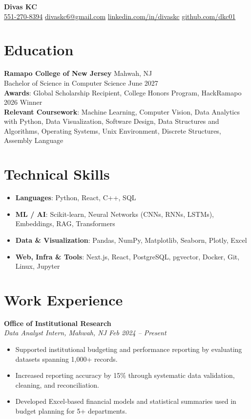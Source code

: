 \documentclass[4paper,25pt]{article}
\begin{document}
\begin{center}
    \textbf{\LARGE Divas KC} \\[5pt]
    \href{tel:+15512708394}{551-270-8394} \hfill
    \href{mailto:divaskc6@gmail.com}{divaskc6@gmail.com} \hfill
    \href{https://www.linkedin.com/in/divaskc/}{linkedin.com/in/divaskc} \hfill
    \href{https://github.com/dkc01}{github.com/dkc01}
\end{center}

\section{Education}
\textbf{Ramapo College of New Jersey} \hfill Mahwah, NJ\\
Bachelor of Science in Computer Science \hfill June 2027\\
\textbf{Awards}: Global Scholarship Recipient, College Honors Program, HackRamapo 2026 Winner\\
\textbf{Relevant Coursework}: Machine Learning, Computer Vision, Data Analytics with Python, Data Visualization, Software Design, Data Structures and Algorithms, Operating Systems, Unix Environment, Discrete Structures, Assembly Language

\section{Technical Skills}
\begin{itemize}\setlength\itemsep{0em}
    \item \textbf{Languages}: Python, React, C++, SQL
    \item \textbf{ML / AI}: Scikit-learn, Neural Networks (CNNs, RNNs, LSTMs), Embeddings, RAG, Transformers
    \item \textbf{Data \& Visualization}: Pandas, NumPy, Matplotlib, Seaborn, Plotly, Excel
    \item \textbf{Web, Infra \& Tools}: Next.js, React, PostgreSQL, pgvector, Docker, Git, Linux, Jupyter
\end{itemize}

\section{Work Experience}

\textbf{Office of Institutional Research} \\
\textit{Data Analyst Intern, Mahwah, NJ \hfill Feb 2024 -- Present}
\begin{itemize}
    \item Supported institutional budgeting and performance reporting by evaluating datasets spanning 1,000+ records.
    \item Increased reporting accuracy by 15\% through systematic data validation, cleaning, and reconciliation.
    \item Developed Excel-based financial models and statistical summaries used in budget planning for 5+ departments.
\end{itemize}
\end{document}
